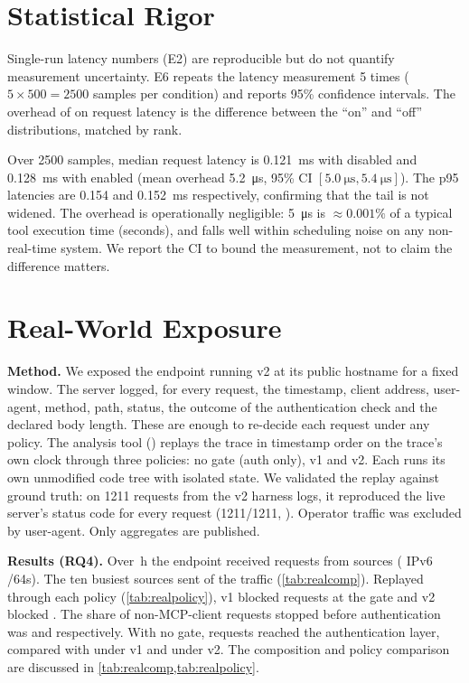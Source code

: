\documentclass[10pt,twocolumn]{article}
\newif\ifrealdata
\begin{document}
\section{Statistical Rigor}\label{sec:latstat}
Single-run latency numbers (E2) are reproducible but do not quantify
measurement uncertainty. E6 repeats the latency measurement 5 times
($5 \times 500 = \num{2500}$ samples per condition) and reports 95\%
confidence intervals. The overhead of \sys{} on request latency is the
difference between the ``on'' and ``off'' distributions, matched by rank.

Over \num{2500} samples, median request latency is \SI{0.121}{\milli\second}
with \sys{} disabled and \SI{0.128}{\milli\second} with \sys{} enabled
(mean overhead \SI{5.2}{\micro\second}, 95\% CI
$[\SI{5.0}{\micro\second}, \SI{5.4}{\micro\second}]$).
The p95 latencies are \SI{0.154}{} and \SI{0.152}{\milli\second} respectively,
confirming that the tail is not widened. The overhead is operationally
negligible: \SI{5}{\micro\second} is ${\approx}0.001\%$ of a typical tool
execution time (seconds), and falls well within scheduling noise on any
non-real-time system. We report the CI to bound the measurement, not to
claim the difference matters.

\section{Real-World Exposure}\label{sec:real}
\noindent\textbf{Method.} We exposed the endpoint running v2 at its public
hostname for a fixed window. The server logged, for every request, the
timestamp, client address, user-agent, method, path, status, the outcome of
the authentication check and the declared body length. These are enough to
re-decide each request under any policy. The analysis tool
() replays the trace in timestamp order on
the trace's own clock through three policies: no gate (auth only), v1 and v2.
Each runs its own unmodified code tree with isolated state. We validated the
replay against ground truth: on 1211 requests from the v2 harness logs, it
reproduced the live server's status code for every request (1211/1211,
). Operator traffic was excluded by
user-agent. Only aggregates are published.

\ifrealdata
\RTCompositionTable
\RTPolicyTable
\noindent\textbf{Results (RQ4).} Over \RTHours\,h the endpoint received
\RTRequests{} requests from \RTSources{} sources (\RTvSix{} IPv6 /64s). The
ten busiest sources sent \RTTopTen{} of the traffic (\cref{tab:realcomp}).
Replayed through each policy (\cref{tab:realpolicy}), v1 blocked
\RTvOneBlocked{} requests at the gate and v2 blocked \RTvTwoBlocked{}. The
share of non-MCP-client requests stopped before authentication was
\RTvOneUnwantedPct{} and \RTvTwoUnwantedPct{} respectively. With no gate,
\RTNoneAuth{} requests reached the authentication layer, compared with
\RTvOneAuth{} under v1 and \RTvTwoAuth{} under v2.
The composition and policy comparison are discussed in
\cref{tab:realcomp,tab:realpolicy}.
\end{document}
